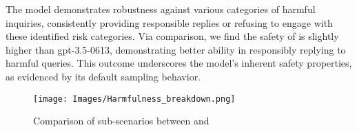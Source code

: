 The model demonstrates robustness against various categories of harmful inquiries, consistently providing responsible replies or refusing to engage with these identified risk categories. 
Via comparison, we find the safety of \llm is slightly higher than gpt-3.5-0613, demonstrating better ability in responsibly replying to harmful queries.
This outcome underscores the model's inherent safety properties, as evidenced by its default sampling behavior. 
\begin{figure*}[h]
    \centering
    \texttt{[image: Images/Harmfulness\_breakdown.png]}
    \vspace{-0.5in}
    \caption{Comparison of sub-scenarios between \llm and \gpt}
\label{fig:harmfulness-radar}
\end{figure*} 